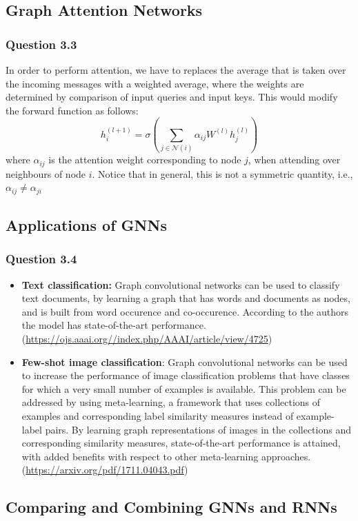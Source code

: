 \documentclass{article}
\begin{document}
\subsection{Graph Attention Networks}
\subsubsection*{Question 3.3}
In order to perform attention, we have to replaces the average that is taken over the incoming messages with a weighted average, where the weights are determined by comparison of input queries and input keys. This would modify the forward function as follows: 
$$
h_i^{(l + 1)} = \sigma\left(\sum_{j \in \mathcal{N}(i)}\alpha_{ij}W^{(l)}h_j^{(l)}\right)
$$ where $\alpha_{ij}$ is the attention weight corresponding to node $j$, when attending over neighbours of node $i$. Notice that in general, this is not a symmetric quantity, i.e., $\alpha_{ij} \neq \alpha_{ji}$
\subsection{Applications of GNNs}
\subsubsection*{Question 3.4}
\begin{itemize}
	\item \textbf{Text classification: }Graph convolutional networks can be used to classify text documents, by learning a graph that has words and documents as nodes, and is built from word occurence and co-occurence. According to the authors the model has state-of-the-art performance. (\url{https://ojs.aaai.org//index.php/AAAI/article/view/4725})
	\item \textbf{Few-shot image classification}: Graph convolutional networks can be used to increase the performance of image classification problems that have classes for which a very small number of examples is available. This problem can be addressed by using meta-learning, a framework that uses collections of examples and corresponding label similarity measures instead of example-label pairs. 
	By learning graph representations of images in the collections and corresponding similarity measures, state-of-the-art performance is attained, with added benefits with respect to other meta-learning approaches. (\url{https://arxiv.org/pdf/1711.04043.pdf})
\end{itemize}
\subsection{Comparing and Combining GNNs and RNNs}
\end{document}
